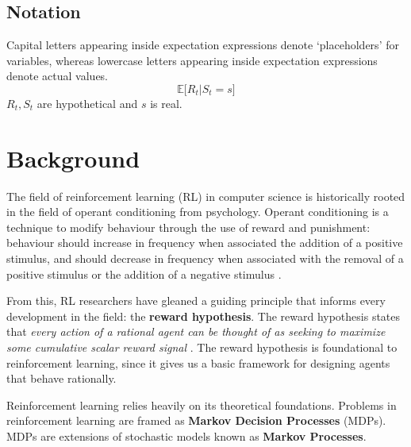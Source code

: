 \documentclass[journal, onecolumn, 12pt, draftclsnofoot]{IEEEtran}
\numberwithin{equation}{section}
\newcommand{\kword}[1]{\textbf{#1}}
\begin{document}
	\title{}

	\author{
		}

	\maketitle
	\begin{abstract}
	\end{abstract}
	\subsection{Notation}
	\par Capital letters appearing inside expectation expressions denote `placeholders' for variables, whereas lowercase letters appearing inside expectation expressions denote actual values.
	$$\mathbb{E}\big[R_t \vert S_t=s\big]$$
	$R_t, S_t$ are hypothetical and $s$ is real.

	\tableofcontents

	\section{Background}
	\par The field of reinforcement learning (RL) in computer science is historically rooted in the field of operant conditioning from psychology. Operant conditioning is a technique to modify behaviour through the use of reward and punishment: behaviour should increase in frequency when associated the addition of a positive stimulus, and should decrease in frequency when associated with the removal of a positive stimulus or the addition of a negative stimulus \cite{operant_conditioning}.
	\par From this, RL researchers have gleaned a guiding principle that informs every development in the field: the \kword{reward hypothesis}. The reward hypothesis states that \textit{every action of a rational agent can be thought of as seeking to maximize some cumulative scalar reward signal} \cite{reward_hypothesis}. The reward hypothesis is foundational to reinforcement learning, since it gives us a basic framework for designing agents that behave rationally.
	\par Reinforcement learning relies heavily on its theoretical foundations. Problems in reinforcement learning are framed as \kword{Markov Decision Processes} (MDPs). MDPs are extensions of stochastic models known as \kword{Markov Processes}.
\end{document}
